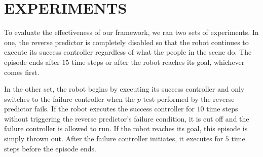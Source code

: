 \documentclass[letterpaper, 10 pt, conference]{ieeeconf}  %
\begin{document}
\section{EXPERIMENTS}\label{sec:experiments}
	To evaluate the effectiveness of our framework, we ran two sets of experiments. In one, the reverse predictor is completely disabled so that the robot continues to execute its success controller regardless of what the people in the scene do. The episode ends after $15$ time steps or after the robot reaches its goal, whichever comes first.
	
	In the other set, the robot begins by executing its success controller and only switches to the failure controller when the $p$-test performed by the reverse predictor fails. If the robot executes the success controller for $10$ time steps without triggering the reverse predictor's failure condition, it is cut off and the failure controller is allowed to run. If the robot reaches its goal, this episode is simply thrown out. After the failure controller initiates, it executes for $5$ time steps before the episode ends. 
	
\end{document}
